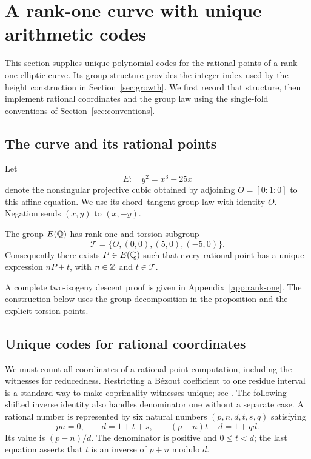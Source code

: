 \section{A rank-one curve with unique arithmetic codes}\label{sec:elliptic}

This section supplies unique polynomial codes for the rational points of
a rank-one elliptic curve. Its group structure provides the integer index
used by the height construction in Section~\ref{sec:growth}. We first
record that structure, then implement rational coordinates and the group
law using the single-fold conventions of Section~\ref{sec:conventions}.

\subsection{The curve and its rational points}

Let
\[
 E:\quad y^2=x^3-25x
\]
denote the nonsingular projective cubic obtained by adjoining
\(O=[0:1:0]\) to this affine equation.  We use its chord--tangent group
law with identity \(O\).  Negation sends \((x,y)\) to \((x,-y)\).

\begin{proposition}\label{prop:rank-one}
The group \(E(\mathbb Q)\) has rank one and torsion subgroup
\[
 \mathcal T=\{O,(0,0),(5,0),(-5,0)\}.
\]
Consequently there exists \(P\in E(\mathbb Q)\) such that every rational
point has a unique expression \(nP+t\), with \(n\in\mathbb Z\) and
\(t\in\mathcal T\).
\end{proposition}

A complete two-isogeny descent proof is given in
Appendix~\ref{app:rank-one}. The construction below uses the group
decomposition in the proposition and the explicit torsion points.

\subsection{Unique codes for rational coordinates}

We must count all coordinates of a rational-point computation, including
the witnesses for reducedness.  Restricting a B\'ezout coefficient to one
residue interval is a standard way to make coprimality witnesses unique;
see \cite[Section~2]{cco2024}.  The following shifted inverse identity
also handles denominator one without a separate case.
A rational number is represented by six
natural numbers \((p,n,d,t,s,q)\) satisfying
\begin{equation}\label{eq:rational-code}
 pn=0,\qquad d=1+t+s,\qquad (p+n)t+d=1+qd.
\end{equation}
Its value is \((p-n)/d\).  The denominator is positive and
\(0\le t<d\); the last equation asserts that \(t\) is an
inverse of \(p+n\) modulo \(d\).

